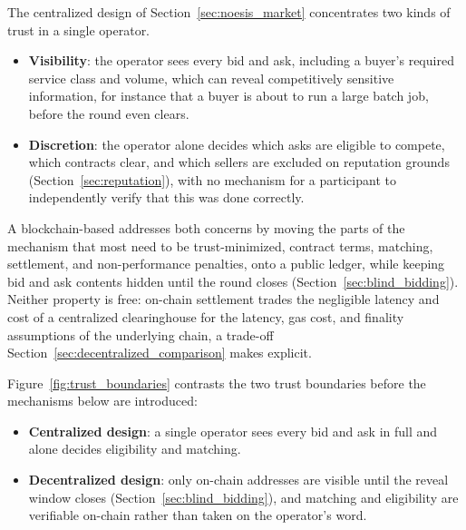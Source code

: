 The centralized design of Section~\ref{sec:noesis_market} concentrates two
kinds of trust in a single operator.

\begin{itemize}
  \item \textbf{Visibility}: the operator sees every bid and ask,
    including a buyer's required service class and volume, which can
    reveal competitively sensitive information, for instance that a
    buyer is about to run a large batch job, before the round even
    clears.
  \item \textbf{Discretion}: the operator alone decides which asks are
    eligible to compete, which contracts clear, and which sellers are
    excluded on reputation grounds (Section~\ref{sec:reputation}), with
    no mechanism for a participant to independently verify that this was
    done correctly.
\end{itemize}

A blockchain-based \NoesisMarket{} addresses both concerns by moving the
parts of the mechanism that most need to be trust-minimized, contract
terms, matching, settlement, and non-performance penalties, onto a public
ledger, while keeping bid and ask contents hidden until the round closes
(Section~\ref{sec:blind_bidding}). Neither property is free: on-chain
settlement trades the negligible latency and cost of a centralized
clearinghouse for the latency, gas cost, and finality assumptions of the
underlying chain, a trade-off Section~\ref{sec:decentralized_comparison}
makes explicit.

Figure~\ref{fig:trust_boundaries} contrasts the two trust boundaries
before the mechanisms below are introduced:

\begin{itemize}
  \item \textbf{Centralized design}: a single operator sees every bid and ask
    in full and alone decides eligibility and matching.
  \item \textbf{Decentralized design}: only on-chain addresses are visible
    until the reveal window closes (Section~\ref{sec:blind_bidding}), and
    matching and eligibility are verifiable on-chain rather than taken on the
    operator's word.
\end{itemize}

